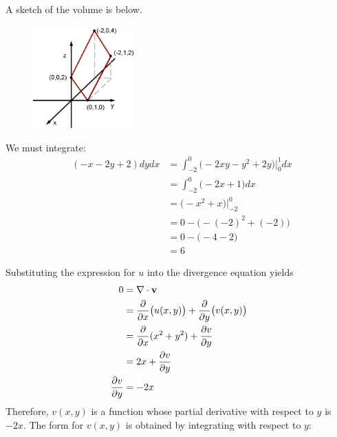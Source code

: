 \documentclass{article}
\begin{document}
\BEN 
\item %
\BEN
\item A sketch of the volume is below. 
\begin{figure}[h]
  \vspace{-1pt}
  \begin{center}
    \includegraphics[width=0.35\textwidth]{ImgSolid.jpg}
  \end{center}
\end{figure}
\item We must integrate:
\begin{align*}
  \mathop{\int_{-2}^0 \! \int_0^1} (-x-2y+2 ) dydx 
  &= \int_{-2}^0 \big( -2xy -y^2 + 2y \big) \big|_0^1 dx \\
  &= \int_{-2}^0 \Big( -2x + 1  \Big) dx \\
  &= \Big(-x^2 + x \Big) \Big|_{-2}^0  \\  
  &= 0- \big(- (-2)^2 + (-2)\big)\\
  &= 0- \big(- 4 -2\big)\\
  &= 6
\end{align*}
\EEN
\item %
\BEN
\item Substituting the expression for $u$ into the divergence equation yields
\begin{align*}
  0&= \nabla \cdot \mathbf{v} \\
  &= \frac{\partial}{\partial x} \big(u(x,y)\big) + \frac{\partial}{\partial y} \big(v(x,y)\big) \\
  &= \frac{\partial}{\partial x} (x^2 + y^2) + \frac{\partial v}{\partial y}\\
  &= 2x + \frac{\partial v}{\partial y} \\
   \frac{\partial v}{\partial y} &= -2x 
\end{align*}
Therefore, $v(x,y)$ is a function whose partial derivative with respect to $y$ is $-2x$. The  form for $v(x,y)$ is obtained by integrating with respect to $y$:
\end{document}
